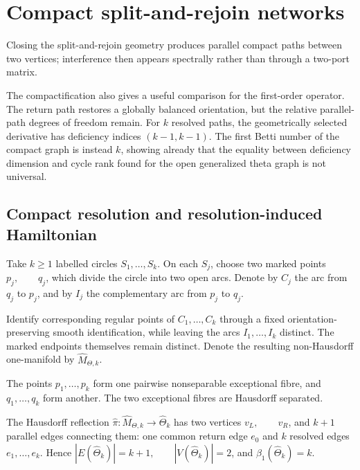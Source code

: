 \documentclass[11pt]{article}
\theoremstyle{plain}
\theoremstyle{definition}
\begin{document}
\section{Compact split-and-rejoin networks}
\label{sec:compact-networks}

Closing the split-and-rejoin geometry produces parallel compact paths between two vertices; interference then appears spectrally rather than through a two-port matrix.

The compactification also gives a useful comparison for the first-order
operator. The return path restores a globally balanced orientation, but the
relative parallel-path degrees of freedom remain. For \(k\) resolved paths,
the geometrically selected derivative has deficiency indices
\((k-1,k-1)\).
The first Betti number of the compact graph is instead \(k\), showing already
that the equality between deficiency dimension and cycle rank found for the
open generalized theta graph is not universal.

\subsection{Compact resolution and resolution-induced Hamiltonian}
\label{subsec:compact-theta-resolution}
\label{subsec:compact-theta-metric}
\label{subsec:compact-theta-Hamiltonian}

Take \(k\geq1\) labelled circles
\(S_1,\ldots,S_k\).
On each \(S_j\), choose two marked points
\(p_j, \qquad q_j\),
which divide the circle into two open arcs. Denote by \(C_j\) the arc from
\(q_j\) to \(p_j\), and by \(I_j\) the complementary arc from \(p_j\) to
\(q_j\).

Identify corresponding regular points of \(C_1,\ldots,C_k\) through a fixed orientation-preserving smooth identification, while leaving
the arcs \(I_1,\ldots,I_k\) distinct. The marked endpoints themselves remain distinct. Denote the
resulting non-Hausdorff one-manifold by
\(\widehat M_{\Theta,k}\).

The points \(p_1,\ldots,p_k\) form one pairwise nonseparable exceptional fibre, and \(q_1,\ldots,q_k\) form another. The two exceptional fibres are Hausdorff separated.

The Hausdorff reflection \(\widehat\pi: \widehat M_{\Theta,k} \longrightarrow \widehat\Theta_k\) has two vertices
\(v_L, \qquad v_R\),
and \(k+1\) parallel edges connecting them: one common return edge \(e_0\) and \(k\) resolved edges
\(e_1,\ldots,e_k\).
Hence
\(|E(\widehat\Theta_k)|=k+1, \qquad |V(\widehat\Theta_k)|=2\),
and
\(\beta_1(\widehat\Theta_k)=k\).
\end{document}
